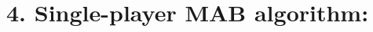 \documentclass[12pt,english,ignorenonframetext,]{beamer}
\providecommand{\tightlist}{%
  \setlength{\itemsep}{0pt}\setlength{\parskip}{0pt}}
\begin{document}
\section{\hfill{}4. Single-player MAB algorithm: \klUCB\hfill{}}









\end{document}
